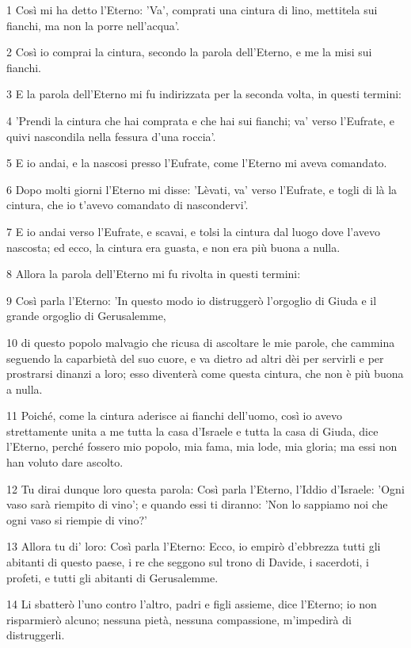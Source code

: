 \par 1 Così mi ha detto l'Eterno: 'Va', comprati una cintura di lino, mettitela sui fianchi, ma non la porre nell'acqua'.
\par 2 Così io comprai la cintura, secondo la parola dell'Eterno, e me la misi sui fianchi.
\par 3 E la parola dell'Eterno mi fu indirizzata per la seconda volta, in questi termini:
\par 4 'Prendi la cintura che hai comprata e che hai sui fianchi; va' verso l'Eufrate, e quivi nascondila nella fessura d'una roccia'.
\par 5 E io andai, e la nascosi presso l'Eufrate, come l'Eterno mi aveva comandato.
\par 6 Dopo molti giorni l'Eterno mi disse: 'Lèvati, va' verso l'Eufrate, e togli di là la cintura, che io t'avevo comandato di nascondervi'.
\par 7 E io andai verso l'Eufrate, e scavai, e tolsi la cintura dal luogo dove l'avevo nascosta; ed ecco, la cintura era guasta, e non era più buona a nulla.
\par 8 Allora la parola dell'Eterno mi fu rivolta in questi termini:
\par 9 Così parla l'Eterno: 'In questo modo io distruggerò l'orgoglio di Giuda e il grande orgoglio di Gerusalemme,
\par 10 di questo popolo malvagio che ricusa di ascoltare le mie parole, che cammina seguendo la caparbietà del suo cuore, e va dietro ad altri dèi per servirli e per prostrarsi dinanzi a loro; esso diventerà come questa cintura, che non è più buona a nulla.
\par 11 Poiché, come la cintura aderisce ai fianchi dell'uomo, così io avevo strettamente unita a me tutta la casa d'Israele e tutta la casa di Giuda, dice l'Eterno, perché fossero mio popolo, mia fama, mia lode, mia gloria; ma essi non han voluto dare ascolto.
\par 12 Tu dirai dunque loro questa parola: Così parla l'Eterno, l'Iddio d'Israele: 'Ogni vaso sarà riempito di vino'; e quando essi ti diranno: 'Non lo sappiamo noi che ogni vaso si riempie di vino?'
\par 13 Allora tu di' loro: Così parla l'Eterno: Ecco, io empirò d'ebbrezza tutti gli abitanti di questo paese, i re che seggono sul trono di Davide, i sacerdoti, i profeti, e tutti gli abitanti di Gerusalemme.
\par 14 Li sbatterò l'uno contro l'altro, padri e figli assieme, dice l'Eterno; io non risparmierò alcuno; nessuna pietà, nessuna compassione, m'impedirà di distruggerli.
